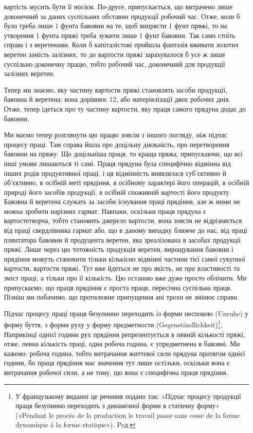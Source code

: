 \parcont{}  %
вартість мусить бути її носієм. По-друге, припускається, що витрачено
лише доконечний за даних суспільних обставин продукції
робочий час. Отже, коли б було треба лише 1 фунта бавовни
на те, щоб випрясти 1 фунт пряжі, то на утворення 1 фунта пряжі
треба зужити лише 1 фунт бавовни. Так само стоїть справа і з
веретенами. Коли б капіталістові прийшла фантазія вживати
золотих веретен замість залізних, то до вартости пряжі зарахувалося
б усе ж лише суспільно-доконечну працю, тобто робочий
час, доконечний для продукції залізних веретен.

Тепер ми знаємо, яку частину вартости пряжі становлять
засоби продукції, бавовна й веретена; вона дорівнює 12,
або матеріялізації двох робочих днів. Отже, тепер ідеться про
ту частину вартости, яку праця самого прядуна додає до бавовни.

Ми маємо тепер розглянути цю працю зовсім з іншого погляду,
ніж підчас процесу праці. Там справа йшла про доцільну діяльність,
про перетворення бавовни на пряжу. Що доцільніша праця,
то краща пряжа, припускаючи, що всі інші умови лишаються
ті самі. Праця прядуна була специфічно відмінна від інших
родів продуктивної праці, і ця відмінність виявлялася суб’єктивно
й об’єктивно, в осібній меті прядіння, в осібному характері його
операцій, в осібній природі його засобів продукції, в осібній споживній
вартості його продукту. Бавовна й веретена служать
за засоби існування праці прядіння, але ж ними не можна зробити
нарізних гармат. Навпаки, оскільки праця прядуна є вартостетворча,
тобто становить джерело вартости, вона зовсім не відрізняється
від праці свердлівника гармат або, що в даному випадку
ближче до нас, від праці плянтатора бавовни й продуцента
веретен, яка зреалізована в засобах продукції пряжі. Лише через
цю тотожність продукція веретен, вирощування бавовни і прядіння
можуть становити тільки кількісно відмінні частини тієї
самої сукупної вартости, вартости пряжі. Тут вже йдеться не
про якість, не про властивості та зміст праці, а тільки про її
кількість. Цю останню вже дуже просто облічити. Ми припускаємо,
що праця прядіння є проста праця, пересічна суспільна
праця. Пізніш ми побачимо, що протилежне припущення ані
трохи не змінює справи.

Підчас процесу праці праця безупинно переходить із форми
неспокою (Unruhe) у форму буття, з форми руху у форму предметности
(\textgerman{Gegenständlichkeit})\footnote*{
У французькому виданні це речення подано так: «Підчас
процесу продукції праця безупинно переходить з динамічної форми в статичну
форму» («Pendant le procès de la production le travail passe sans
cesse de la forme dynamique à la forme statique»). Peд.
}. Наприкінці однієї години рух
прядіння репрезентується в певній кількості пряжі, отже, певна
кількість праці, одна робоча година, є упредметнена в бавовні.
Ми кажемо: робоча година, тобто витрачання життєвої сили прядуна
протягом однієї години, бо праця прядіння має значення
тут лише остільки, оскільки вона є витрачання робочої сили,
а не тому, що вона є специфічна праця прядіння.
